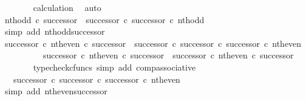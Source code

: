 \begin{isabellebody}
\ \ \ \ \ \ \isamarkupfalse%
\ calculation\ \isamarkupfalse%
\ auto\isanewline
\ \ \isamarkupfalse%
\isanewline
\isanewline
\ \ \isamarkupfalse%
\ {\isachardoublequoteopen}nth{\isacharunderscore}{\kern0pt}odd\ {\isasymcirc}\isactrlsub c\ successor\ {\isacharequal}{\kern0pt}\ {\isacharparenleft}{\kern0pt}successor\ {\isasymcirc}\isactrlsub c\ successor{\isacharparenright}{\kern0pt}\ {\isasymcirc}\isactrlsub c\ nth{\isacharunderscore}{\kern0pt}odd{\isachardoublequoteclose}\isanewline
\ \ \ \ \isamarkupfalse%
\ {\isacharparenleft}{\kern0pt}simp\ add{\isacharcolon}{\kern0pt}\ nth{\isacharunderscore}{\kern0pt}odd{\isacharunderscore}{\kern0pt}successor{\isacharparenright}{\kern0pt}\isanewline
\isanewline
\ \ \isamarkupfalse%
\ {\isachardoublequoteopen}{\isacharparenleft}{\kern0pt}successor\ {\isasymcirc}\isactrlsub c\ nth{\isacharunderscore}{\kern0pt}even{\isacharparenright}{\kern0pt}\ {\isasymcirc}\isactrlsub c\ successor\ {\isacharequal}{\kern0pt}\ {\isacharparenleft}{\kern0pt}successor\ {\isasymcirc}\isactrlsub c\ successor{\isacharparenright}{\kern0pt}\ {\isasymcirc}\isactrlsub c\ successor\ {\isasymcirc}\isactrlsub c\ nth{\isacharunderscore}{\kern0pt}even{\isachardoublequoteclose}\isanewline
\ \ \isamarkupfalse%
\ {\isacharminus}{\kern0pt}\isanewline
\ \ \ \ \isamarkupfalse%
\ {\isachardoublequoteopen}{\isacharparenleft}{\kern0pt}successor\ {\isasymcirc}\isactrlsub c\ nth{\isacharunderscore}{\kern0pt}even{\isacharparenright}{\kern0pt}\ {\isasymcirc}\isactrlsub c\ successor\ {\isacharequal}{\kern0pt}\ successor\ {\isasymcirc}\isactrlsub c\ nth{\isacharunderscore}{\kern0pt}even\ {\isasymcirc}\isactrlsub c\ successor{\isachardoublequoteclose}\isanewline
\ \ \ \ \ \ \isamarkupfalse%
\ {\isacharparenleft}{\kern0pt}typecheck{\isacharunderscore}{\kern0pt}cfuncs{\isacharcomma}{\kern0pt}\ simp\ add{\isacharcolon}{\kern0pt}\ comp{\isacharunderscore}{\kern0pt}associative{}{\isacharparenright}{\kern0pt}\isanewline
\ \ \ \ \isamarkupfalse%
\ \isamarkupfalse%
\ {\isachardoublequoteopen}{\isachardot}{\kern0pt}{\isachardot}{\kern0pt}{\isachardot}{\kern0pt}\ {\isacharequal}{\kern0pt}\ successor\ {\isasymcirc}\isactrlsub c\ successor\ {\isasymcirc}\isactrlsub c\ successor\ {\isasymcirc}\isactrlsub c\ nth{\isacharunderscore}{\kern0pt}even{\isachardoublequoteclose}\isanewline
\ \ \ \ \ \ \isamarkupfalse%
\ {\isacharparenleft}{\kern0pt}simp\ add{\isacharcolon}{\kern0pt}\ nth{\isacharunderscore}{\kern0pt}even{\isacharunderscore}{\kern0pt}successor{}{\isacharparenright}{\kern0pt}\isanewline

\end{isabellebody}
